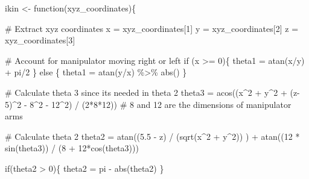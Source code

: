 \documentclass[
  letterpaper,
  DIV=11,
  numbers=noendperiod]{scrreprt}
\newenvironment{Shaded}{\begin{snugshade}}{\end{snugshade}}
\newcommand{\CommentTok}[1]{\textcolor[rgb]{0.37,0.37,0.37}{#1}}
\newcommand{\ControlFlowTok}[1]{\textcolor[rgb]{0.00,0.23,0.31}{#1}}
\newcommand{\DecValTok}[1]{\textcolor[rgb]{0.68,0.00,0.00}{#1}}
\newcommand{\FloatTok}[1]{\textcolor[rgb]{0.68,0.00,0.00}{#1}}
\newcommand{\FunctionTok}[1]{\textcolor[rgb]{0.28,0.35,0.67}{#1}}
\newcommand{\NormalTok}[1]{\textcolor[rgb]{0.00,0.23,0.31}{#1}}
\newcommand{\OtherTok}[1]{\textcolor[rgb]{0.00,0.23,0.31}{#1}}
\newcommand{\SpecialCharTok}[1]{\textcolor[rgb]{0.37,0.37,0.37}{#1}}
\begin{document}
\begin{Shaded}
\begin{Highlighting}[]
\NormalTok{ikin }\OtherTok{\textless{}{-}} \ControlFlowTok{function}\NormalTok{(xyz\_coordinates)\{}
  
  \CommentTok{\# Extract xyz coordinates}
\NormalTok{  x }\OtherTok{=}\NormalTok{ xyz\_coordinates[}\DecValTok{1}\NormalTok{]}
\NormalTok{  y }\OtherTok{=}\NormalTok{ xyz\_coordinates[}\DecValTok{2}\NormalTok{]}
\NormalTok{  z }\OtherTok{=}\NormalTok{ xyz\_coordinates[}\DecValTok{3}\NormalTok{]}
  
  \CommentTok{\# Account for manipulator moving right or left}
  \ControlFlowTok{if}\NormalTok{ (x }\SpecialCharTok{\textgreater{}=} \DecValTok{0}\NormalTok{)\{}
\NormalTok{    theta1 }\OtherTok{=} \FunctionTok{atan}\NormalTok{(x}\SpecialCharTok{/}\NormalTok{y) }\SpecialCharTok{+}\NormalTok{ pi}\SpecialCharTok{/}\DecValTok{2}
\NormalTok{  \} }\ControlFlowTok{else}\NormalTok{ \{}
\NormalTok{    theta1 }\OtherTok{=} \FunctionTok{atan}\NormalTok{(y}\SpecialCharTok{/}\NormalTok{x) }\SpecialCharTok{\%\textgreater{}\%} \FunctionTok{abs}\NormalTok{()}
\NormalTok{  \}}
  
  \CommentTok{\# Calculate theta 3 since its needed in theta 2}
\NormalTok{  theta3 }\OtherTok{=} \FunctionTok{acos}\NormalTok{((x}\SpecialCharTok{\^{}}\DecValTok{2} \SpecialCharTok{+}\NormalTok{ y}\SpecialCharTok{\^{}}\DecValTok{2} \SpecialCharTok{+}\NormalTok{ (z}\DecValTok{{-}5}\NormalTok{)}\SpecialCharTok{\^{}}\DecValTok{2} \SpecialCharTok{{-}} \DecValTok{8}\SpecialCharTok{\^{}}\DecValTok{2} \SpecialCharTok{{-}} \DecValTok{12}\SpecialCharTok{\^{}}\DecValTok{2}\NormalTok{) }\SpecialCharTok{/}\NormalTok{ (}\DecValTok{2}\SpecialCharTok{*}\DecValTok{8}\SpecialCharTok{*}\DecValTok{12}\NormalTok{))}
    \CommentTok{\# 8 and 12 are the dimensions of manipulator arms}
  
  
  \CommentTok{\# Calculate theta 2}
\NormalTok{  theta2 }\OtherTok{=} \FunctionTok{atan}\NormalTok{((}\FloatTok{5.5} \SpecialCharTok{{-}}\NormalTok{ z) }\SpecialCharTok{/}\NormalTok{ (}\FunctionTok{sqrt}\NormalTok{(x}\SpecialCharTok{\^{}}\DecValTok{2} \SpecialCharTok{+}\NormalTok{ y}\SpecialCharTok{\^{}}\DecValTok{2}\NormalTok{)) ) }\SpecialCharTok{+} \FunctionTok{atan}\NormalTok{((}\DecValTok{12} \SpecialCharTok{*} \FunctionTok{sin}\NormalTok{(theta3)) }\SpecialCharTok{/}\NormalTok{ (}\DecValTok{8} \SpecialCharTok{+} \DecValTok{12}\SpecialCharTok{*}\FunctionTok{cos}\NormalTok{(theta3)))}
  
  \ControlFlowTok{if}\NormalTok{(theta2 }\SpecialCharTok{\textgreater{}} \DecValTok{0}\NormalTok{)\{}
\NormalTok{    theta2 }\OtherTok{=}\NormalTok{ pi }\SpecialCharTok{{-}} \FunctionTok{abs}\NormalTok{(theta2)}
\NormalTok{  \}}
  

\end{Highlighting}
\end{Shaded}
\end{document}
